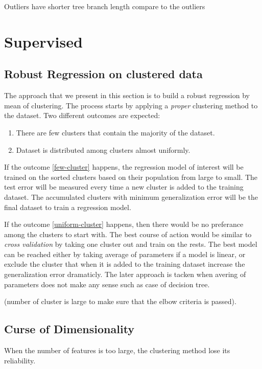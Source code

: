 \documentclass{article}
\begin{document}
Outliers have shorter tree branch length compare to the outliers

\section{Supervised}

\subsection{Robust Regression on clustered data}

The approach that we present in this section is to build a robust regression by mean of clustering. The process starts by applying a {\em proper} clustering method to the dataset.  Two different outcomes are expected:

\begin{enumerate}
\item \label{few-cluster} There are few clusters that contain the majority of the dataset.
\item \label{uniform-cluster} Dataset is distributed among clusters almost uniformly.
\end{enumerate}

If the outcome \ref{few-cluster}  happens, the regression model of interest will be trained on the sorted clusters based on their population from large to small. The test error will be measured every time a new cluster is added to the training dataset. The accumulated clusters with minimum generalization error will be the final dataset to train a regression model.

If the outcome \ref{uniform-cluster}  happens, then there would be no preferance among the clusters to start with. The best course of action would be similar to {\em cross validation} by taking one cluster  out and train on the rests. The best model can be reached either by taking average of parameters if a model is linear,  or exclude the cluster that when it is added to the training dataset increase the generalization error dramaticly. The later approach is tacken when avering of parameters does not make any sense such as case of decision tree. 

(number of cluster is large to make sure that the elbow criteria is passed).


\subsection{Curse of Dimensionality}
When the number of features is too large, the clustering method lose its reliability.
\end{document}
